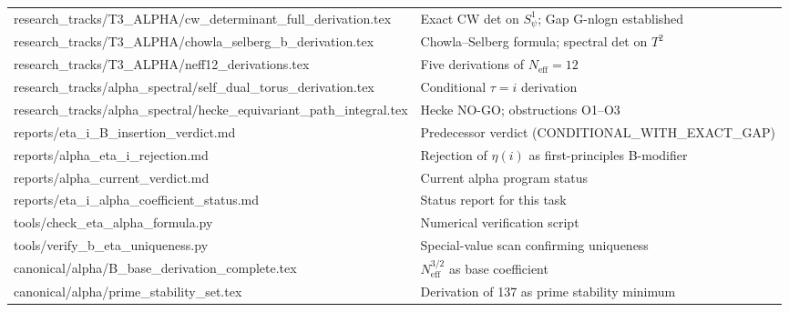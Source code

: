 \documentclass[12pt,a4paper]{article}
\theoremstyle{definition}
\theoremstyle{remark}
\newcommand{\Neff}{N_{\mathrm{eff}}}
\begin{document}
\begin{infobox}
\begin{tabular}{>{\ttfamily\small}p{} p{}}
research\_tracks/T3\_ALPHA/cw\_determinant\_full\_derivation.tex
  & Exact CW det on $S^1_\psi$; Gap G-nlogn established \\
research\_tracks/T3\_ALPHA/chowla\_selberg\_b\_derivation.tex
  & Chowla--Selberg formula; spectral det on $T^2$ \\
research\_tracks/T3\_ALPHA/neff12\_derivations.tex
  & Five derivations of $\Neff = 12$ \\
research\_tracks/alpha\_spectral/self\_dual\_torus\_derivation.tex
  & Conditional $\tau = i$ derivation \\
research\_tracks/alpha\_spectral/hecke\_equivariant\_path\_integral.tex
  & Hecke NO-GO; obstructions O1--O3 \\
reports/eta\_i\_B\_insertion\_verdict.md
  & Predecessor verdict (CONDITIONAL\_WITH\_EXACT\_GAP) \\
reports/alpha\_eta\_i\_rejection.md
  & Rejection of $\eta(i)$ as first-principles B-modifier \\
reports/alpha\_current\_verdict.md
  & Current alpha program status \\
reports/eta\_i\_alpha\_coefficient\_status.md
  & Status report for this task \\
tools/check\_eta\_alpha\_formula.py
  & Numerical verification script \\
tools/verify\_b\_eta\_uniqueness.py
  & Special-value scan confirming uniqueness \\
canonical/alpha/B\_base\_derivation\_complete.tex
  & $\Neff^{3/2}$ as base coefficient \\
canonical/alpha/prime\_stability\_set.tex
  & Derivation of 137 as prime stability minimum \\
\end{tabular}
\end{infobox}

\ifdefined\INCLUDEMODE
\else
  
\end{document}
